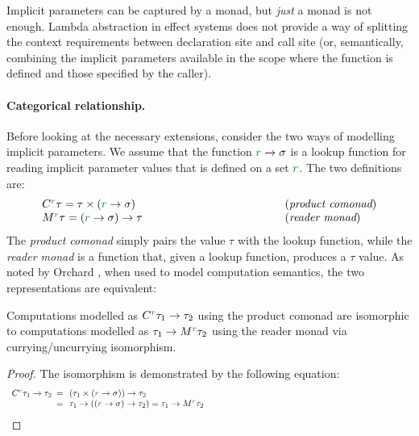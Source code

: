 Implicit parameters can be captured by a monad, but \emph{just} a monad is not enough.
Lambda abstraction in effect systems does not provide a way of splitting the context
requirements between declaration site and call site (or, semantically, combining the implicit 
parameters available in the scope where the function is defined and those specified by the caller).

\paragraph{Categorical relationship.}
Before looking at the necessary extensions, consider the two ways of modelling implicit 
parameters. We assume that the function $\cclrd{r} \rightarrow \sigma$ is a lookup function
for reading implicit parameter values that is defined on a set $\cclrd{r}$. The two definitions
are:
%
\begin{equation*}
\begin{array}{lll}
 \ctyp{\cclrd{r}}\tau = \tau \times (\cclrd{r} \rightarrow \sigma) &~\hspace{10em}~& (\emph{product comonad}) \\
 \mtyp{\cclrd{r}}\tau = (\cclrd{r} \rightarrow \sigma) \rightarrow \tau && (\emph{reader monad})
\end{array} 
\end{equation*}
%
The \emph{product comonad} simply pairs the value $\tau$ with the lookup function, while
the \emph{reader monad} is a function that, given a lookup function, produces a $\tau$ value.
As noted by Orchard \cite{comonads-vs-monads}, when used to model computation semantics, the 
two representations are equivalent:
%
\begin{remark}
Computations modelled as $\ctyp{\cclrd{r}}{\tau_1}\rightarrow\tau_2$ using the product comonad
are isomorphic to computations modelled as $\tau_1\rightarrow\mtyp{\cclrd{r}}{\tau_2}$ using the
reader monad via currying/uncurrying isomorphism.
\end{remark}
\begin{proof}
The isomorphism is demonstrated by the following equation:
\begin{equation*}
\begin{array}{lll}
 \ctyp{\cclrd{r}}{\tau_1} \rightarrow \tau_2 &\narrow{=}&
 (\tau_1 \times (\cclrd{r} \rightarrow \sigma)) \rightarrow \tau_2 \\
 &\narrow{=}& \tau_1 \rightarrow ((\cclrd{r} \rightarrow \sigma) \rightarrow \tau_2) =
 \tau_1 \rightarrow \mtyp{\cclrd{r}}{\tau_2} \hspace{23em}\qedhere \\
\end{array}
\end{equation*}
\end{proof}


